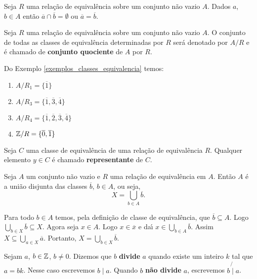 \begin{corolario}
	Seja $R$ uma relação de equivalência sobre um conjunto não vazio $A$. Dados $a$, $b \in A$ então $\overline{a} \cap \overline{b} = \emptyset$ ou $\overline{a} = \overline{b}$.
\end{corolario}

\begin{definicao}
	Seja $R$ uma relação de equivalência sobre um conjunto não vazio $A$. O conjunto de todas as classes de equival{\^e}ncia determinadas por $R$ ser{\'a} denotado por $A/R$ e {\'e} chamado de \textbf{conjunto quociente} de $A$ por $R$.
\end{definicao}

\begin{exemplos}
	Do Exemplo \ref{exemplos_classes_equivalencia} temos:
	\begin{enumerate}
		\item $A/R_1 = \{\overline{1}\}$
		\item $A/R_3 = \{\overline{1},\overline{3},\overline{4}\}$
		\item $A/R_4 = \{\overline{1},\overline{2},\overline{3},\overline{4}\}$
		\item $\mathbb{Z}/R = \{\overline{0},\overline{1}\}$
	\end{enumerate}
\end{exemplos}

\begin{definicao}
	Seja $C$ uma classe de equival{\^e}ncia de uma rela{\c c}{\~a}o de equival{\^e}ncia $R$. Qualquer elemento $y\in C$ {\'e} chamado \textbf{representante} de $C$.
\end{definicao}

\begin{proposicao}
	Seja $A$ um conjunto n{\~a}o vazio e $R$ uma rela{\c c}{\~a}o de equival{\^e}ncia em $A$. Ent{\~a}o $A$ {\'e} a uni{\~a}o disjunta das classes $\overline{b}$, $b \in A$, ou seja,
	\[
		X = \bigcup_{b\in A}\overline{b}.
	\]
\end{proposicao}
\begin{prova}
	Para todo $b\in A$ temos, pela definição de classe de equivalência, que $\overline{b}\subseteq A$. Logo $\bigcup_{b\in X}\overline{b}\subseteq X$. Agora seja $x\in A$. Logo $x \in \overline{x}$ e da{\'\i} $x\in \bigcup_{b\in A}\overline{b}$. Assim $X\subseteq\bigcup_{a\in X}\overline{a}$. Portanto, $X=\bigcup_{b\in X}\overline{b}$.
\end{prova}

\begin{definicao}
	Sejam $a$, $b \in \mathbb{Z}$, $b \neq 0$. Dizemos que $b$ \textbf{divide} $a$ quando existe um inteiro $k$ tal que $a=bk$.
	Nesse caso escrevemos $b \mid a$. Quando $b$ \textbf{n{\~a}o divide} $a$, escrevemos $b\not{\mid}a$.
\end{definicao}

